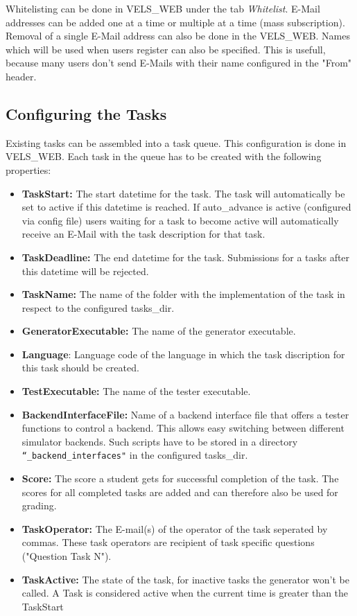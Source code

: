Whitelisting can be done in VELS\_WEB under the tab {\it Whitelist}. E-Mail addresses can be added
one at a time or multiple at a time (mass subscription). Removal of a single E-Mail address
can also be done in the VELS\_WEB. Names which will be used when users register can also be
specified. This is usefull, because many users don't send E-Mails with their name configured
in the "From" header.

\subsection{Configuring the Tasks} \label{sub:configTasks}
Existing tasks can be assembled into a task queue. This configuration is done in VELS\_WEB.
Each task in the queue has to be created with the following properties:
\begin{itemize}
\item {\bf TaskStart:} The start datetime for the task. The task will automatically
    be set to active if this datetime is reached. If auto\_advance is active (configured
    via config file) users waiting for a task to become active will automatically
    receive an E-Mail with the task description for that task.
\item {\bf TaskDeadline:} The end datetime for the task. Submissions for a tasks after
    this datetime will be rejected.
\item {\bf TaskName:} The name of the folder with the implementation of the task in respect
	to the configured tasks\_dir.
\item {\bf GeneratorExecutable:} The name of the generator executable.
\item {\bf Language}: Language code of the language in which the task discription for
	this task should be created.
\item {\bf TestExecutable:} The name of the tester executable.
\item {\bf BackendInterfaceFile:} Name of a backend interface file that offers a tester functions to control a backend. This allows easy
	switching between different simulator backends.	Such scripts have to be stored in a directory
	{\tt ``\_backend\_interfaces"} in the configured
	tasks\_dir.
\item {\bf Score:} The score a student gets for successful completion of the task. The
    scores for all completed tasks are added and can therefore also be used for grading.
\item {\bf TaskOperator:} The E-mail(s) of the operator of the task seperated by commas.
	These task operators are recipient of task specific questions ("Question Task N").
\item {\bf TaskActive:} The state of the task, for inactive tasks the generator won't
    be called. A Task is considered active when the current time is greater than the
    TaskStart
\end{itemize}

